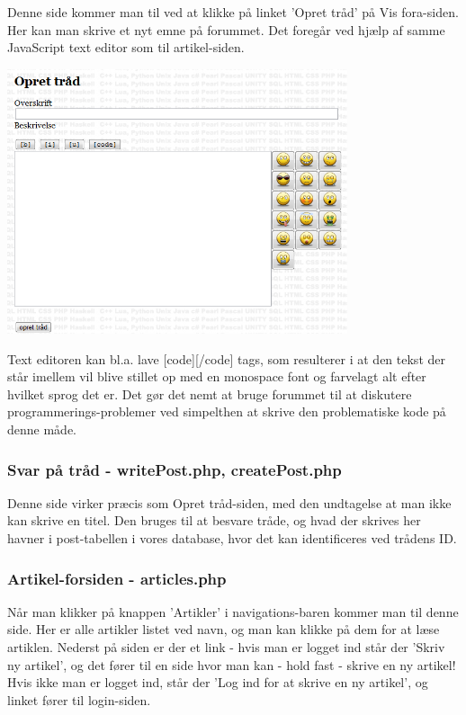 \documentclass{article}
\begin{document}
Denne side kommer man til ved at klikke på linket 'Opret tråd' på Vis fora-siden. Her kan man skrive et nyt emne på forummet. Det foregår ved hjælp af samme JavaScript text editor som til artikel-siden.

\includegraphics[width=100mm]{mi17.png}

Text editoren kan bl.a. lave [code][/code] tags, som resulterer i at den tekst der står imellem vil blive stillet op med en monospace font og farvelagt alt efter hvilket sprog det er. Det gør det nemt at bruge forummet til at diskutere programmerings-problemer ved simpelthen at skrive den problematiske kode på denne måde.

\subsubsection[Svar på tråd]{Svar på tråd - writePost.php, createPost.php}

Denne side virker præcis som Opret tråd-siden, med den undtagelse at man ikke kan skrive en titel. Den bruges til at besvare tråde, og hvad der skrives her havner i post-tabellen i vores database, hvor det kan identificeres ved trådens ID.

\subsubsection[Artikel-forsiden]{Artikel-forsiden - articles.php}
Når man klikker på knappen 'Artikler' i navigations-baren kommer man til denne side. Her er alle artikler listet ved navn, og man kan klikke på dem for at læse artiklen. Nederst på siden er der et link - hvis man er logget ind står der 'Skriv ny artikel', og det fører til en side hvor man kan - hold fast - skrive en ny artikel! Hvis ikke man er logget ind, står der 'Log ind for at skrive en ny artikel', og linket fører til login-siden.
\end{document}
